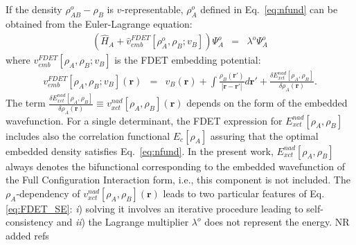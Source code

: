 \documentclass[journal=jctcce,manuscript=article]{achemso}
\newcommand{\nr}[1]{\color{red}#1\color{black}}
\begin{document}
If the density $\rho^{o}_{AB}-\rho_{B}$ is $v$-representable,  $\rho_A^{o}$ defined in Eq.~\ref{eq:nfund} can be obtained from the Euler-Lagrange equation:
\begin{eqnarray}
    \left( \hat{H}_A + \hat{v}_{emb}^{{FDET}}[\rho_A^{{o}}, \rho_B; v_B] \right) \Psi_A^{{o}} &=& \lambda^{o}\Psi_A^{{o}} \label{eq:FDET_SE} 
\end{eqnarray}
where $v_{emb}^{{FDET}}[\rho_A,\rho_B; v_B]$
is the FDET embedding potential:
\begin{eqnarray}
v_{emb}^{{FDET}}[\rho_A,\rho_B; v_B](\mathbf{r}) &=& v_B(\mathbf{r}) +  \int \frac{\rho_B(\mathbf{r}')}{|\mathbf{r}-\mathbf{r}'|} d\mathbf{r}'+ \frac{\delta E_{xct}^{nad}[\rho_A,\rho_B]}{\delta\rho_A(\mathbf{r})}.
\label{eq:nFDET_embpot}  
\end{eqnarray}
The term $\frac{\delta E_{xct}^{nad}[\rho_A,\rho_B]}{\delta\rho_A(\mathbf{r})}\equiv v_{xct}^{nad}[\rho_A,\rho_B](\mathbf{r})$ depends on the form of the embedded wavefunction\cite{Wesolowski2008}.
For a single determinant, the FDET expression for $E_{xct}^{nad}[\rho_A,\rho_B]$   includes also the correlation functional $E_c[\rho_A]$  assuring that the optimal embedded density satisfies Eq.~\ref{eq:nfund}. 
In the present work,  $E_{xct}^{nad}[\rho_A,\rho_B]$ \nr{always } denotes the \nr{bi}functional corresponding to the embedded wavefunction of the Full Configuration Interaction form\cite{Wesolowski2008}, i.e., \nr{this component is not included}.
The $\rho_A$-dependency of  $v_{xct}^{nad}[\rho_A,\rho_B](\mathbf{r})$ leads to two 
particular features of Eq. \ref {eq:FDET_SE}: {\it i}) solving it involves an iterative procedure leading to self-consistency\cite{Dulak2009} and {\it ii}) the Lagrange multiplier $\lambda^{o}$  does not represent the energy.\cite{Zech2016}  \nr{NR added refs }
\end{document}
